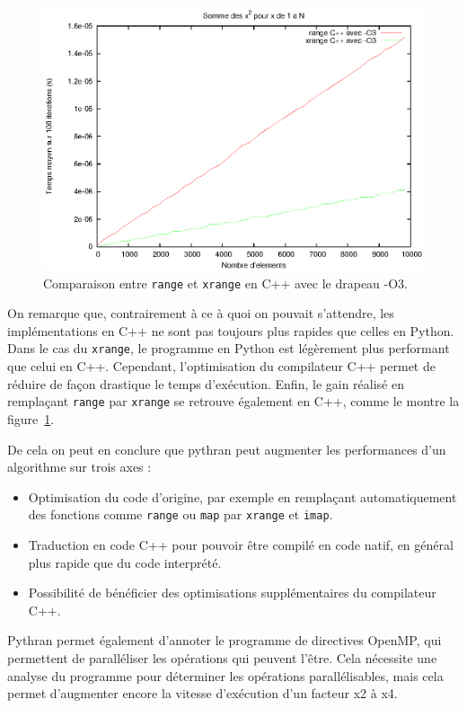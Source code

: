 \documentclass[a4paper]{article}
\begin{document}
\begin{figure}[h]
  \includegraphics[width=\textwidth]{./Pictures/RangeXrangeCppO3}
  \caption{Comparaison entre \texttt{range} et \texttt{xrange} en C++
    avec le drapeau -O3.}
  \label{RangeXrangeCppO3}
\end{figure}

On remarque que, contrairement à ce à quoi on pouvait s'attendre, les
implémentations en C++ ne sont pas toujours plus rapides que celles en
Python. Dans le cas du \texttt{xrange}, le programme en Python est
légèrement plus performant que celui en C++. Cependant, l'optimisation
du compilateur C++ permet de réduire de façon drastique le temps
d'exécution. Enfin, le gain réalisé en remplaçant \texttt{range} par
\texttt{xrange} se retrouve également en C++, comme le montre la
figure~\ref{RangeXrangeCppO3}.

De cela on peut en conclure que pythran peut augmenter les
performances d'un algorithme sur trois axes :

\begin{itemize}
\item Optimisation du code d'origine, par exemple en remplaçant
  automatiquement des fonctions comme \texttt{range} ou \texttt{map}
  par \texttt{xrange} et \texttt{imap}.
\item Traduction en code C++ pour pouvoir être compilé en code natif,
  en général plus rapide que du code interprété.
\item Possibilité de bénéficier des optimisations supplémentaires du
  compilateur C++.
\end{itemize}


Pythran permet également d'annoter le programme de directives OpenMP,
qui permettent de paralléliser les opérations qui peuvent l'être. Cela
nécessite une analyse du programme pour déterminer les opérations
parallélisables, mais cela permet d'augmenter encore la vitesse
d'exécution d'un facteur x2 à x4\cite{PythranRenpar}.
\end{document}
